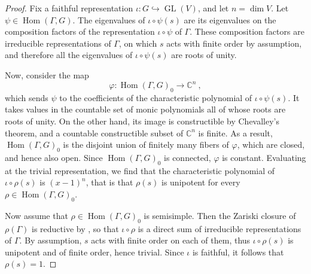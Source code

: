 \documentclass[11pt, a4paper]{amsart}
\theoremstyle{definition}
\theoremstyle{myitemstyle}
\newcommand{\C}{\mathbb{C}}
\DeclareMathOperator{\Hom}{Hom}
\DeclareMathOperator{\GL}{GL}
\begin{document}
\begin{proof}
Fix a faithful representation $\iota\colon G\hookrightarrow\GL(V)$, and let $n=\dim V$. Let $\psi\in \Hom(\Gamma,G)$. The eigenvalues of $\iota\circ \psi(s)$ are its eigenvalues on the composition factors of the representation  $\iota\circ \psi$ of $\Gamma$. These composition factors are irreducible representations of $\Gamma$, on which $s$ acts with finite order by assumption, and therefore all the eigenvalues of $\iota\circ\psi(s)$ are roots of unity.

Now, consider the map
\[
    \varphi\colon\Hom(\Gamma,G)_0\longrightarrow\C^{n}\ ,
\]
which sends $\psi$ to the coefficients of the characteristic polynomial of $\iota\circ\psi(s)$. It takes values in the countable set of monic polynomials all of whose roots are roots of unity. On the other hand, its image is constructible by Chevalley's theorem, and a countable constructible subset of $\C^n$ is finite. 
As a result, $\Hom(\Gamma,G)_0$ is the disjoint union of finitely many fibers of $\varphi$, which are closed, and hence also open. Since $\Hom(\Gamma,G)_0$ is connected, $\varphi$ is constant.
Evaluating at the trivial representation, we find that the characteristic polynomial of $\iota\circ\rho(s)$ is $(x-1)^{n}$, that is that $\rho(s)$ is unipotent for every $\rho\in \Hom(\Gamma,G)_0$.

Now assume that $\rho\in \Hom(\Gamma,G)_0$ is semisimple. Then the Zariski closure of $\rho(\Gamma)$ is reductive by \cite[Theorem 3.6]{Richardson}, so that $\iota\circ \rho$ is a direct sum of irreducible representations of $\Gamma$. By assumption, $s$ acts with finite order on each of them, thus $\iota\circ\rho(s)$ is unipotent and of finite order, hence trivial. Since $\iota$ is faithful, it follows that $\rho(s)=1$.
\end{proof}
\end{document}
